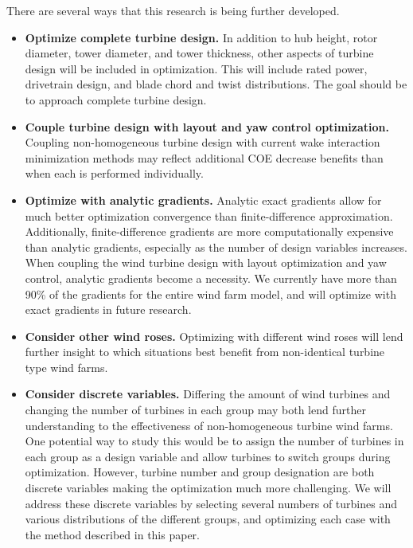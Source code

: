 \documentclass[conf]{new-aiaa}
\begin{document}
There are several ways that this research is being further developed.
\begin{itemize}
\item \textbf{Optimize complete turbine design.} In addition to hub height, rotor diameter, tower diameter, and tower thickness, other aspects of turbine design will be included in optimization. This will include rated power, drivetrain design, and blade chord and twist distributions. The goal should be to approach complete turbine design.
\item \textbf{Couple turbine design with layout and yaw control optimization.} Coupling non-homogeneous turbine design with current wake interaction minimization methods may reflect additional COE decrease benefits than when each is performed individually.
\item{\textbf{Optimize with analytic gradients.}} Analytic exact gradients allow for much better optimization convergence than finite-difference approximation. Additionally, finite-difference gradients are more computationally expensive than analytic gradients, especially as the number of design variables increases. When coupling the wind turbine design with layout optimization and yaw control, analytic gradients become a necessity. We currently have more than 90\% of the gradients for the entire wind farm model, and will optimize with exact gradients in future research.
\item{\textbf{Consider other wind roses.}} Optimizing with different wind roses will lend further insight to which situations best benefit from non-identical turbine type wind farms.
\item{\textbf{Consider discrete variables.} Differing the amount of wind turbines and changing the number of turbines in each group may both lend further understanding to the effectiveness of non-homogeneous turbine wind farms. One potential way to study this would be to assign the number of turbines in each group as a design variable and allow turbines to switch groups during optimization. However, turbine number and group designation are both discrete variables making the optimization much more challenging. We will address these discrete variables by selecting several numbers of turbines and various distributions of the different groups, and optimizing each case with the method described in this paper.}

\end{itemize}
\end{document}
